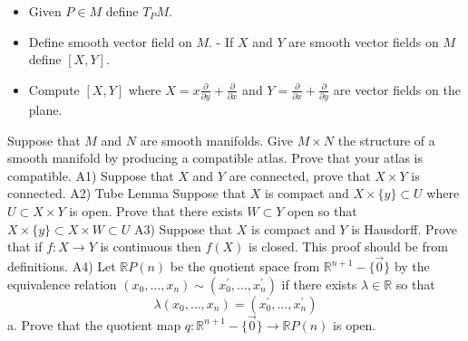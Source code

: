 \documentclass[10pt]{article}
\begin{document}
\begin{itemize}
  \item Given $P \in M$ define $T_{P} M$.

  \item Define smooth vector field on $M$. - If $X$ and $Y$ are smooth vector fields on $M$ define $[X, Y]$.

  \item Compute $[X, Y]$ where $X=x \frac{\partial}{\partial y}+\frac{\partial}{\partial x}$ and $Y=\frac{\partial}{\partial x}+\frac{\partial}{\partial y}$ are vector fields on the plane.

\end{itemize}
\newpage
 Suppose that $M$ and $N$ are smooth manifolds. Give $M \times N$ the structure of a smooth manifold by producing a compatible atlas. Prove that your atlas is compatible.
\newpage
A1) Suppose that $X$ and $Y$ are connected, prove that $X \times Y$ is connected.
\newpage
A2) Tube Lemma Suppose that $X$ is compact and $X \times\{y\} \subset U$ where $U \subset X \times Y$ is open. Prove that there exists $W \subset Y$ open so that $X \times\{y\} \subset X \times W \subset U$
\newpage
A3) Suppose that $X$ is compact and $Y$ is Hausdorff. Prove that if $f: X \rightarrow Y$ is continuous then $f(X)$ is closed. This proof should be from definitions.
\newpage
A4) Let $\mathbb{R} P(n)$ be the quotient space from $\mathbb{R}^{n+1}-\{\overrightarrow{0}\}$ by the equivalence relation $\left(x_{0}, \ldots, x_{n}\right) \sim\left(x_{0}^{\prime}, \ldots, x_{n}^{\prime}\right)$ if there exists $\lambda \in \mathbb{R}$ so that
$$
\lambda\left(x_{0}, \ldots, x_{n}\right)=\left(x_{0}^{\prime}, \ldots, x_{n}^{\prime}\right)
$$
a. Prove that the quotient map $q: \mathbb{R}^{n+1}-\{\overrightarrow{0}\} \rightarrow \mathbb{R} P(n)$ is open.
\end{document}
